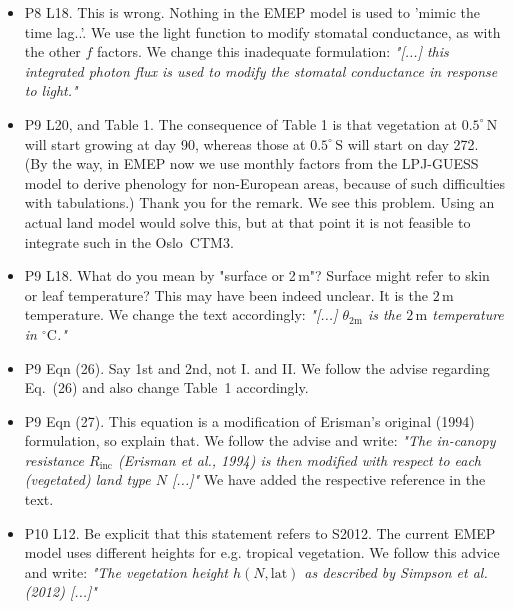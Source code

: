 \begin{itemize}
\item {\color{blue}P8 L18. This is wrong. Nothing in the EMEP model is used to ’mimic the
time lag..’. We use the light function to modify stomatal conductance, as with the
other $f$ factors.}
  We change this inadequate formulation: \emph{"[...] this integrated photon flux is used to modify the stomatal conductance in response to light."}
  
\item {\color{blue}P9 L20, and Table 1. The consequence of Table 1 is that vegetation at $0.5^\circ\,\mathrm{N}$
will start growing at day 90, whereas those at $0.5^\circ\,\mathrm{S}$ will start on day 272. (By the
way, in EMEP now we use monthly factors from the LPJ-GUESS model to derive
phenology for non-European areas, because of such difficulties with tabulations.)}
  Thank you for the remark. We see this problem. Using an actual land model would solve this, but at that point it is not feasible to integrate such in the Oslo~CTM3.
  
\item {\color{blue}P9 L18. What do you mean by "surface or 2\,m"? Surface might refer to skin or leaf temperature?}
  This may have been indeed unclear. It is the $\mathrm{2\,m}$ temperature. We change the text accordingly: \emph{"[...] $\theta_\mathrm{2m}$ is the $2\,\mathrm{m}$ temperature in $\mathrm{^\circ C}$."}
  
\item {\color{blue}P9 Eqn (26). Say 1st and 2nd, not I. and II.}
  We follow the advise regarding Eq.~(26) and also change Table~1 accordingly.
  
\item {\color{blue}P9 Eqn (27). This equation is a modification of Erisman’s original (1994) formulation, so explain that.}
  We follow the advise and write: \emph{"The in-canopy resistance $R_\text{inc}$ (Erisman et al., 1994) is then modified with respect to each (vegetated) land type $N$ [...]"} {We have added the respective reference in the text.}
  
\item {\color{blue}P10 L12. Be explicit that this statement refers to S2012. The current EMEP
  model uses different heights for e.g. tropical vegetation.}
  We follow this advice and write: \emph{"The vegetation height $h(N, \text{lat})$ as described by Simpson et al. (2012) [...]"}
  

\end{itemize}
